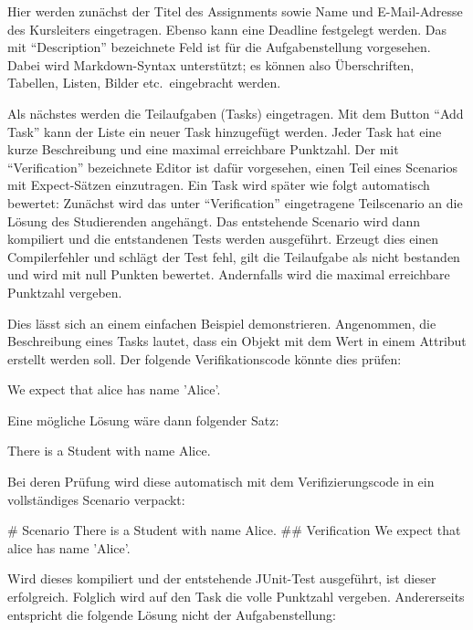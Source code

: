 Hier werden zunächst der Titel des Assignments sowie Name und E-Mail-Adresse des Kursleiters eingetragen.
Ebenso kann eine Deadline festgelegt werden.
Das mit ``Description'' bezeichnete Feld ist für die Aufgabenstellung vorgesehen.
Dabei wird Markdown-Syntax unterstützt; es können also Überschriften, Tabellen, Listen, Bilder etc.\ eingebracht werden.

Als nächstes werden die Teilaufgaben (Tasks) eingetragen.
Mit dem Button ``Add Task'' kann der Liste ein neuer Task hinzugefügt werden.
Jeder Task hat eine kurze Beschreibung und eine maximal erreichbare Punktzahl.
Der mit ``Verification'' bezeichnete Editor ist dafür vorgesehen, einen Teil eines Scenarios mit Expect-Sätzen einzutragen.
Ein Task wird später wie folgt automatisch bewertet:
Zunächst wird das unter ``Verification'' eingetragene Teilscenario an die Lösung des Studierenden angehängt.
Das entstehende Scenario wird dann kompiliert und die entstandenen Tests werden ausgeführt.
Erzeugt dies einen Compilerfehler und schlägt der Test fehl, gilt die Teilaufgabe als nicht bestanden und wird mit null Punkten bewertet.
Andernfalls wird die maximal erreichbare Punktzahl vergeben.

Dies lässt sich an einem einfachen Beispiel demonstrieren.
Angenommen, die Beschreibung eines Tasks lautet, dass ein Objekt  mit dem Wert  in einem Attribut  erstellt werden soll.
Der folgende Verifikationscode könnte dies prüfen:

\begin{mdcodeblock}
    We expect that alice has name 'Alice'.
\end{mdcodeblock}

Eine mögliche Lösung wäre dann folgender Satz:

\begin{mdcodeblock}
    There is a Student with name Alice.
\end{mdcodeblock}

Bei deren Prüfung wird diese automatisch mit dem Verifizierungscode in ein vollständiges Scenario verpackt:

\begin{mdcodeblock}
    # Scenario
    There is a Student with name Alice.
    ## Verification
    We expect that alice has name 'Alice'.
\end{mdcodeblock}

Wird dieses kompiliert und der entstehende JUnit-Test ausgeführt, ist dieser erfolgreich.
Folglich wird auf den Task die volle Punktzahl vergeben.
Andererseits entspricht die folgende Lösung nicht der Aufgabenstellung:


